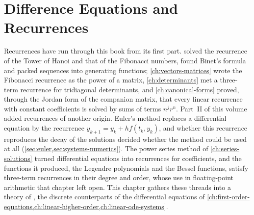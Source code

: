 \chapter{Difference Equations and Recurrences}
\label{ch:difference-equations}


Recurrences have run through this book from its first part.  solved the recurrence of the Tower of Hanoi and that of the Fibonacci numbers, found Binet's formula and packed sequences into generating functions; \cref{ch:vectors-matrices} wrote the Fibonacci recurrence as the power of a matrix, \cref{ch:determinants} met a three-term recurrence for tridiagonal determinants, and \cref{ch:canonical-forms} proved, through the Jordan form of the companion matrix, that every linear recurrence with constant coefficients is solved by sums of terms $n^jr^n$. Part~II of this volume added recurrences of another origin. Euler's method replaces a differential equation by the recurrence $y_{k+1}=y_k+hf(t_k,y_k)$, and whether this recurrence reproduces the decay of the solutions decided whether the method could be used at all (\cref{sec:euler,sec:systems-numerics}). The power series method of \cref{ch:series-solutions} turned differential equations into recurrences for coefficients, and the functions it produced, the Legendre polynomials and the Bessel functions, satisfy three-term recurrences in their degree and order, whose use in floating-point arithmetic that chapter left open. This chapter gathers these threads into a theory of , the discrete counterparts of the differential equations of \cref{ch:first-order-equations,ch:linear-higher-order,ch:linear-ode-systems}.

